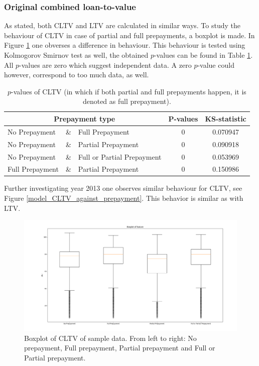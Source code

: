     \subsubsection{Original combined loan-to-value}
        As stated, both CLTV and LTV are calculated in similar ways. 
        To study the behaviour of CLTV in case of partial and full 
        prepayments, a boxplot is made. In Figure \ref{model_boxplot_CLTV} 
        one obverses a difference in behaviour. This behaviour is tested 
        using Kolmogorov Smirnov test as well, the obtained $p$-values 
        can be found in Table \ref{model_Pvals_of_CLTV}. All $p$-values 
        are zero which suggest independent data. A zero $p$-value could 
        however, correspond to too much data, as well.
        \begin{table}[H]
        \centering
            \begin{tabular}{lcl|c|c}
                \multicolumn{3}{c|}{Prepayment type} 
                & P-values& KS-statistic \\\hline
                No Prepayment & \& & Full Prepayment & 0 & 0.070947\\
                No Prepayment & \& & Partial Prepayment & 0 & 0.090918\\
                No Prepayment & \& & Full or Partial Prepayment & 0 & 0.053969 \\
                Full Prepayment & \& & Partial Prepayment & 0 & 0.150986
		    \end{tabular}
            \caption{
                $p$-values of CLTV (in which if both partial and full 
                prepayments happen, it is denoted as full prepayment).
                }
	        \label{model_Pvals_of_CLTV}
        \end{table}
        Further investigating year 2013 one observes similar behaviour 
        for CLTV, see Figure \ref{model_CLTV_against_prepayment}. 
        This behavior is similar as with LTV.
        \begin{figure}[H]
            \centering
            \includegraphics[width=\linewidth]{Figures/Boxplot_of_cltv_[2013, 2014, 2015, 2016, 2017, 2018, 2019, 2020]_.png}
            \caption{
                Boxplot of CLTV of sample data. From left to right: 
                No prepayment, Full prepayment, Partial prepayment 
                and Full or Partial prepayment.
                }
            \label{model_boxplot_CLTV}
        \end{figure}
